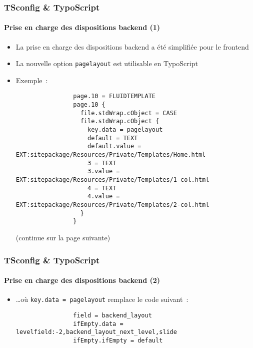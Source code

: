 \begin{frame}[fragile]
	\frametitle{TSconfig \& TypoScript}
	\framesubtitle{Prise en charge des dispositions backend (1)}

	\lstset{basicstyle=\tiny\ttfamily}

	\begin{itemize}

		\item La prise en charge des dispositions backend a été simplifiée pour le frontend

		\item La nouvelle option \texttt{pagelayout} est utilisable en TypoScript

		\item Exemple~:

			\begin{lstlisting}
				page.10 = FLUIDTEMPLATE
				page.10 {
				  file.stdWrap.cObject = CASE
				  file.stdWrap.cObject {
				    key.data = pagelayout
				    default = TEXT
				    default.value = EXT:sitepackage/Resources/Private/Templates/Home.html
				    3 = TEXT
				    3.value = EXT:sitepackage/Resources/Private/Templates/1-col.html
				    4 = TEXT
				    4.value = EXT:sitepackage/Resources/Private/Templates/2-col.html
				  }
				}
			\end{lstlisting}

			\smaller
				(continue sur la page suivante)
			\normalsize

	\end{itemize}

\end{frame}


\begin{frame}[fragile]
	\frametitle{TSconfig \& TypoScript}
	\framesubtitle{Prise en charge des dispositions backend (2)}

	\lstset{basicstyle=\tiny\ttfamily}

	\begin{itemize}

		\item …où \texttt{key.data = pagelayout} remplace le code suivant~:

			\begin{lstlisting}
				field = backend_layout
				ifEmpty.data = levelfield:-2,backend_layout_next_level,slide
				ifEmpty.ifEmpty = default
			\end{lstlisting}

	\end{itemize}

\end{frame}

